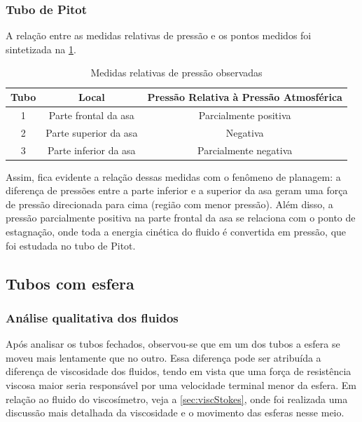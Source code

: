 \subsubsection{Tubo de Pitot}
    A relação entre as medidas relativas de pressão e os pontos medidos foi
    sintetizada na \cref{erapraserumquadro-sequiserarrumevc}.
    \begin{table}[H]
    \caption{Medidas relativas de pressão observadas}\label{erapraserumquadro-sequiserarrumevc}
    \begin{center}
    \begin{tabular}{c c c}
    \hline
    Tubo & Local & Pressão Relativa à Pressão Atmosférica \\
    \hline
    1    & Parte frontal da asa & Parcialmente positiva\\
    2    & Parte superior da asa & Negativa\\
    3    & Parte inferior da asa & Parcialmente negativa\\
    \hline
    \end{tabular}
    \end{center}
    \end{table}
    Assim, fica evidente a relação dessas medidas com o fenômeno de planagem: a
    diferença de pressões entre a parte inferior e a superior da asa geram uma
    força de pressão direcionada para cima (região com menor pressão). Além
    disso, a pressão parcialmente positiva na parte frontal da asa se relaciona
    com o ponto de estagnação, onde toda a energia cinética do fluido é
    convertida em pressão, que foi estudada no tubo de Pitot.

\subsection{Tubos com esfera}
\subsubsection{Análise qualitativa dos fluidos}
    Após analisar os tubos fechados, observou-se que em um dos tubos a esfera se
    moveu mais lentamente que no outro. Essa diferença pode ser atribuída a
    diferença de viscosidade dos fluidos, tendo em vista que uma força de
    resistência viscosa maior seria responsável por uma velocidade terminal
    menor da esfera. Em relação ao fluido do viscosímetro, veja
    a \cref{sec:viscStokes}, onde foi realizada uma discussão mais
    detalhada da viscosidade e o movimento das esferas nesse meio.


